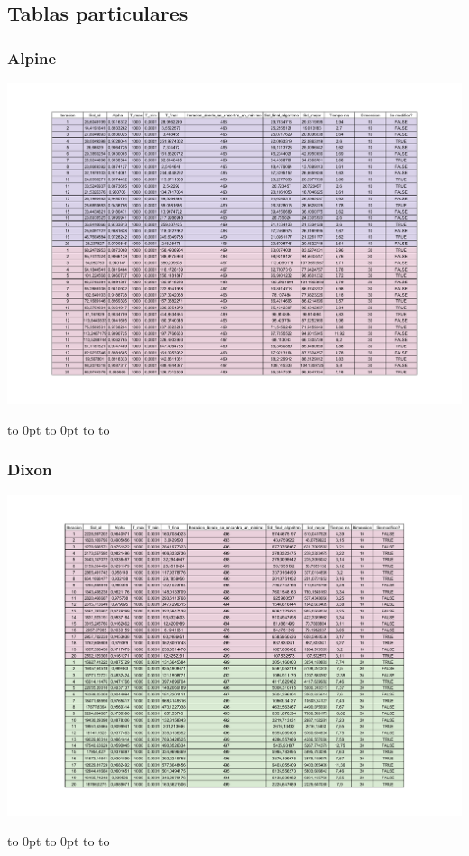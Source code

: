 \documentclass[10pt]{article}
\def\fillandplacepagenumber{%
 \par\pagestyle{empty}%
 \vbox to 0pt{\vss}\vfill
 \vbox to 0pt{\baselineskip0pt
   \hbox to\linewidth{\hss}%
   \baselineskip\footskip
   \hbox to\linewidth{%
     \hfil\thepage\hfil}\vss}}
\begin{document}
\begin{landscape}
  \subsection{Tablas particulares}
  \subsubsection{Alpine}
  \begin{center}
    \includegraphics[scale=0.7]{docs/RMHC_SA_Metaheuristics-SA_Alpine.pdf}
  \end{center}
  \fillandplacepagenumber
  \subsubsection{Dixon}
  \begin{center}
    \includegraphics[scale=0.7]{docs/RMHC_SA_Metaheuristics-SA_Dixon.pdf}
  \end{center}
  \fillandplacepagenumber

\end{landscape}
\end{document}
